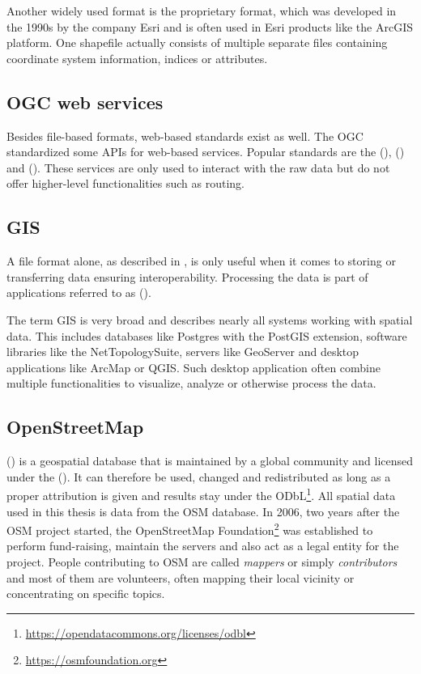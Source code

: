 			Another widely used format is the proprietary  format, which was developed in the 1990s by the company Esri \cite{esri-shapefile-spec} and is often used in Esri products like the ArcGIS platform.
			One shapefile actually consists of multiple separate files containing coordinate system information, indices or attributes.
			
	\subsection{OGC web services}
	
		Besides file-based formats, web-based standards exist as well.
		The OGC standardized some APIs for web-based services.
		Popular standards are the  (),  () and  ().
		These services are only used to interact with the raw data but do not offer higher-level functionalities such as routing.
	
	\subsection{GIS}
	
		A file format alone, as described in , is only useful when it comes to storing or transferring data ensuring interoperability.
		Processing the data is part of applications referred to as  ().
		
		The term GIS is very broad and describes nearly all systems working with spatial data.
		This includes databases like Postgres with the PostGIS extension, software libraries like the NetTopologySuite, servers like GeoServer and desktop applications like ArcMap or QGIS.
		Such desktop application often combine multiple functionalities to visualize, analyze or otherwise process the data.
	
	\subsection{OpenStreetMap}
	\label{subsec:osm}
	
		 () is a geospatial database that is maintained by a global community and licensed under the  ()\cite{osm-wiki-about}.
		It can therefore be used, changed and redistributed as long as a proper attribution is given and results stay under the ODbL\footnote{\url{https://opendatacommons.org/licenses/odbl}}.
		All spatial data used in this thesis is data from the OSM database.
		In 2006, two years after the OSM project started, the OpenStreetMap Foundation\footnote{\url{https://osmfoundation.org}} was established to perform fund-raising, maintain the servers and also act as a legal entity for the project.
		People contributing to OSM are called \textit{mappers} or simply \textit{contributors} and most of them are volunteers, often mapping their local vicinity or concentrating on specific topics.
		

